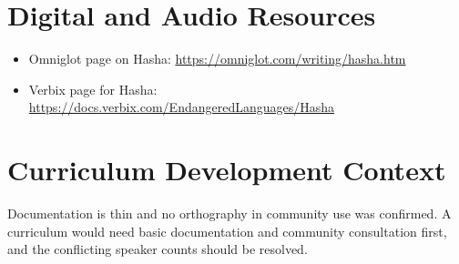 \documentclass[12pt]{article}
\begin{document}
\section{Digital and Audio Resources}
\begin{itemize}
\item Omniglot page on Hasha: \url{https://omniglot.com/writing/hasha.htm}
\item Verbix page for Hasha: \url{https://docs.verbix.com/EndangeredLanguages/Hasha}
\end{itemize}

\section{Curriculum Development Context}
Documentation is thin and no orthography in community use was confirmed. A curriculum would need basic documentation and community consultation first, and the conflicting speaker counts should be resolved.
\end{document}
